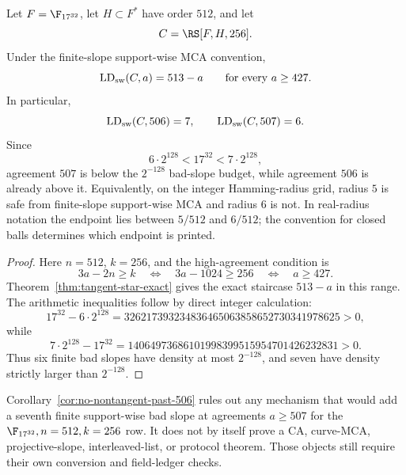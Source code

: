\begin{corollary}
\label{cor:no-nontangent-past-506}
Let \(F=\F_{17^{32}}\), let \(H\subset F^*\) have order \(512\), and let
\[
  C=\RS[F,H,256].
\]
Under the finite-slope support-wise MCA convention,
\[
  \operatorname{LD}_{\rm sw}(C,a)=513-a
  \qquad\text{for every }a\ge427.
\]
In particular,
\[
  \operatorname{LD}_{\rm sw}(C,506)=7,
  \qquad
  \operatorname{LD}_{\rm sw}(C,507)=6.
\]
Since
\[
  6\cdot2^{128}<17^{32}<7\cdot2^{128},
\]
agreement \(507\) is below the \(2^{-128}\) bad-slope budget, while agreement
\(506\) is already above it.  Equivalently, on the integer Hamming-radius grid,
radius \(5\) is safe from finite-slope support-wise MCA and radius \(6\) is
not.  In real-radius notation the endpoint lies between
\(5/512\) and \(6/512\); the convention for closed balls determines which
endpoint is printed.
\end{corollary}

\begin{proof}
Here \(n=512\), \(k=256\), and the high-agreement condition is
\[
  3a-2n\ge k
  \quad\Longleftrightarrow\quad
  3a-1024\ge256
  \quad\Longleftrightarrow\quad
  a\ge427.
\]
Theorem~\ref{thm:tangent-star-exact} gives the exact staircase
\(513-a\) in this range.  The arithmetic inequalities follow by direct integer
calculation:
\[
  17^{32}-6\cdot2^{128}
  =326217393234836465063858652730341978625>0,
\]
while
\[
  7\cdot2^{128}-17^{32}
  =14064973686101998399515954701426232831>0.
\]
Thus six finite bad slopes have density at most \(2^{-128}\), and seven have
density strictly larger than \(2^{-128}\).
\end{proof}

\begin{remark}
Corollary~\ref{cor:no-nontangent-past-506} rules out any mechanism that would
add a seventh finite support-wise bad slope at agreements \(a\ge507\) for the
\(\F_{17^{32}},n=512,k=256\) row.  It does not by itself prove a CA,
curve-MCA, projective-slope, interleaved-list, or protocol theorem.  Those
objects still require their own conversion and field-ledger checks.
\end{remark}
